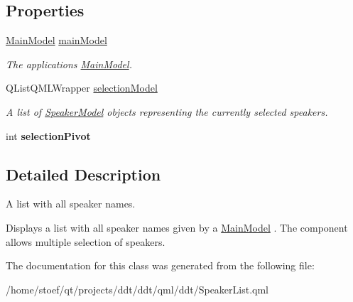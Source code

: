 \subsection*{Properties}
\begin{DoxyCompactItemize}
\item 
\hypertarget{classSpeakerList_a3e4892babaaccd9db11118c2e3549f92}{\hyperlink{classMainModel}{Main\-Model} \hyperlink{classSpeakerList_a3e4892babaaccd9db11118c2e3549f92}{main\-Model}}\label{classSpeakerList_a3e4892babaaccd9db11118c2e3549f92}

\begin{DoxyCompactList}\small\item\em The applications {\ttfamily \hyperlink{classMainModel}{Main\-Model}}. \end{DoxyCompactList}\item 
\hypertarget{classSpeakerList_a22bbe6408e3c4766f2fe97c0dab66cc2}{Q\-List\-Q\-M\-L\-Wrapper \hyperlink{classSpeakerList_a22bbe6408e3c4766f2fe97c0dab66cc2}{selection\-Model}}\label{classSpeakerList_a22bbe6408e3c4766f2fe97c0dab66cc2}

\begin{DoxyCompactList}\small\item\em A list of {\ttfamily \hyperlink{classSpeakerModel}{Speaker\-Model}} objects representing the currently selected speakers. \end{DoxyCompactList}\item 
\hypertarget{classSpeakerList_a049fe3e4c9a66d59107407bb698f963c}{int {\bfseries selection\-Pivot}}\label{classSpeakerList_a049fe3e4c9a66d59107407bb698f963c}

\end{DoxyCompactItemize}


\subsection{Detailed Description}
{\ttfamily A} list with all speaker names.

Displays a list with all speaker names given by a {\ttfamily \hyperlink{classMainModel}{Main\-Model}} . The component allows multiple selection of speakers. 

The documentation for this class was generated from the following file\-:\begin{DoxyCompactItemize}
\item 
/home/stoef/qt/projects/ddt/ddt/qml/ddt/Speaker\-List.\-qml\end{DoxyCompactItemize}
